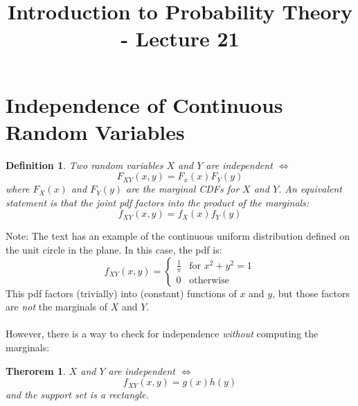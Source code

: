 \documentclass[12pt]{article} %
\date{}
\title{Introduction to Probability Theory - Lecture 21}
\newtheorem{defn}{Definition}
\newtheorem{thm}{Therorem}
\begin{document}
\maketitle

\section{Independence of Continuous Random Variables}
\begin{defn}
Two random variables $X$ and $Y$ are independent $\iff$ 
$$F_{XY}(x,y) = F_x(x)F_Y(y)$$
where $F_X(x)$ and $F_Y(y)$ are the marginal CDFs for $X$ and $Y$. An equivalent statement is that the joint pdf factors into the product of the marginals:
$$f_{XY}(x,y) = f_X(x)f_Y(y)$$
\end{defn} 
Note: The text has an example of the continuous uniform distribution defined on the unit circle in the plane. In this case, the pdf is:
$$f_{XY}(x,y) = \left\{\begin{matrix}\frac1\pi & \textrm{for } x^2+y^2 =1\\0&\textrm{otherwise}\end{matrix}\right.$$
This pdf factors (trivially) into (constant) functions of $x$ and $y$, but those factors are \emph{not} the marginals of $X$ and $Y$.\\\\
However, there is a way to check for independence \emph{without} computing the marginals:
\begin{thm}
$X$ and $Y$ are independent $\iff$
$$f_{XY}(x,y) = g(x)h(y)$$
and \emph{the support set is a rectangle}.
\end{thm}
\end{document}
